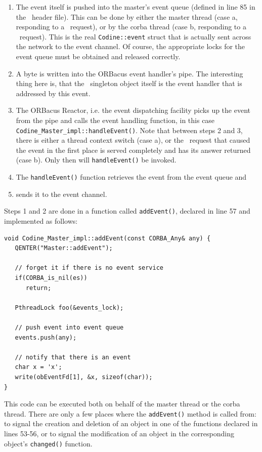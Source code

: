 \begin{enumerate}
\item The event itself is pushed into the master's event queue (defined in
line 85 in the \master\ header file). This can be done by either the
master thread (case a, responding to a \codapi\ request), or by the 
corba thread (case b, responding to a \qidl\ request).
This is the real \texttt{Codine::event} struct that is actually sent across
the network to the event channel.
Of course, the appropriate locks for the event queue must be obtained 
and released correctly.
\item A byte is written into the ORBacus event handler's pipe. The interesting
thing here is, that the \master\ singleton object itself is the event
handler that is addressed by this event.
\item The ORBacus Reactor, i.e. the event dispatching facility picks up the
event from the pipe and calls the event handling function, in this case
\texttt{Codine\_Master\_impl::handleEvent()}. Note that between steps 2 and
3, there is either a thread context switch (case a), or the \qidl\ request
that caused the event in the first place is served completely and has its
answer returned (case b). Only then will \texttt{handleEvent()} be invoked.
\item The \texttt{handleEvent()} function retrieves the event from the event
queue and
\item sends it to the event channel.
\end{enumerate}

Steps 1 and 2 are done in a function called \texttt{addEvent()}, declared in
line 57 and implemented as follows:

\begin{Verbatim}[fontsize=\small, frame=single]
void Codine_Master_impl::addEvent(const CORBA_Any& any) {
   QENTER("Master::addEvent");

   // forget it if there is no event service
   if(CORBA_is_nil(es))
      return;

   PthreadLock foo(&events_lock);

   // push event into event queue
   events.push(any);

   // notify that there is an event
   char x = 'x';
   write(obEventFd[1], &x, sizeof(char));
}
\end{Verbatim}

This code can be executed both on behalf of the master thread or the corba
thread. There are only a few places where the \texttt{addEvent()} method is
called from: to signal the creation and deletion of an object in one of the
functions declared in lines 53-56, or to signal the modification of an object
in the corresponding object's \texttt{changed()} function. 

